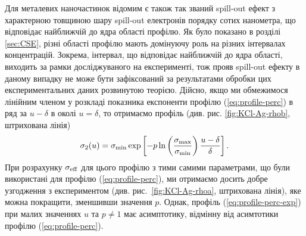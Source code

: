 \documentclass[14pt,twoside]{vakthesis}
\begin{document}
Для металевих наночастинок відомим є також так званий spill-out ефект \cite{Weick2006} з характерною товщиною шару spill-out електронів порядку сотих нанометра, що відповідає найближчій до ядра області профілю. Як було показано в розділі \ref{sec:CSE}, різні області профілю мають домінуючу роль на різних інтервалах концентрацій. Зокрема, інтервал, що відповідає найближчій до ядра області, виходить за рамки досліджуваного на експерименті, тож прояв spill-out ефекту в даному випадку не може бути зафіксований за результатами обробки цих експериментальних даних розвинутою теорією. Дійсно, якщо ми обмежимося лінійним членом у розкладі показника експоненти профілю (\ref{eq:profile-perc}) в ряд за $u-\delta$ в околі
$u=\delta$, то отримаємо профіль (див. рис. \ref{fig:KCl-Ag-rhob}, штрихована лінія)
\begin{equation}\label{eq:profile-perc-exp}
	\sigma_2 (u) = \sigma_{\rm min} \exp \left[ - p \ln \left( \frac{\sigma_{\rm max}}{\sigma_{\rm min}} \right) \frac{u - \delta}{\delta} \right] .
\end{equation}
При розрахунку $\sigma_{\rm eff}$ для цього профілю з тими самими параметрами, що були використані для профілю (\ref{eq:profile-perc}), ми отримаємо досить добре узгодження з експериментом (див. рис.~\ref{fig:KCl-Ag-rhoa}, штрихована лінія), яке можна покращити, зменшивши значення $p$. Однак, профіль (\ref{eq:profile-perc-exp}) при малих значеннях $u$ та $p\neq 1$ має асимптотику, відмінну від асимтотики профілю (\ref{eq:profile-perc}).
\end{document}
